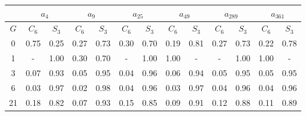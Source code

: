 \begin{table}[h]
   \begin{center}
        \begin{tabular}{c|c|c|c|c|c|c|c|c|c|c|c|c}
            \toprule
            & \multicolumn{2}{c|}{$a_{4}$} & \multicolumn{2}{c|}{$a_{9}$} & \multicolumn{2}{c|}{$a_{25}$} & \multicolumn{2}{c|}{$a_{49}$} & \multicolumn{2}{c|}{$a_{289}$} & \multicolumn{2}{c}{$a_{361}$} \\
            \midrule
            $G$ & $C_{6}$ & $S_{3}$ & $C_{6}$ & $S_{3}$ & $C_{6}$ & $S_{3}$ & $C_{6}$ & $S_{3}$ & $C_{6}$ & $S_{3}$ & $C_{6}$ & $S_{3}$ \\
            \midrule
            0 & 0.75 & 0.25 & 0.27 & 0.73 & 0.30 & 0.70 & 0.19 & 0.81 & 0.27 & 0.73 & 0.22 & 0.78 \\
            1 & - & 1.00 & 0.30 & 0.70 & - & 1.00 & 1.00 & - & - & 1.00 & 1.00 & - \\
            3 & 0.07 & 0.93 & 0.05 & 0.95 & 0.04 & 0.96 & 0.06 & 0.94 & 0.05 & 0.95 & 0.05 & 0.95 \\
            6 & 0.03 & 0.97 & 0.02 & 0.98 & 0.04 & 0.96 & 0.03 & 0.97 & 0.04 & 0.96 & 0.04 & 0.96 \\
            21 & 0.18 & 0.82 & 0.07 & 0.93 & 0.15 & 0.85 & 0.09 & 0.91 & 0.12 & 0.88 & 0.11 & 0.89 \\
            \bottomrule
        \end{tabular}
   \end{center}
\end{table}
